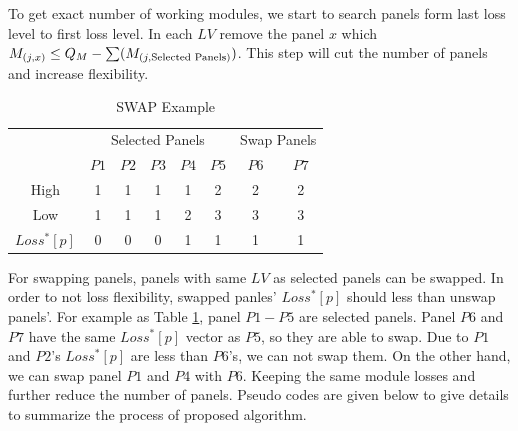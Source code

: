 \documentclass[conference]{IEEEtran}
\begin{document}
To get exact number of working modules, we start to search panels form last loss level to first loss level. In each $LV$ remove the panel $x$ which $M_{(j,x)} \leq Q_M - \sum (M_{(j,\textup{Selected Panels})})$. This step will cut the number of panels and increase flexibility.

\begin{table}[htbp]
\caption{SWAP Example}
\begin{center}
\begin{tabular}{c|ccccc|cc}\hline \hline
                               & \multicolumn{5}{c|}{Selected Panels} & \multicolumn{2}{c}{Swap Panels} \\
                               & $P1$    & $P2$   & $P3$    & $P4$    & $P5$   & $P6$            & $P7$             \\ \hline
High                           & 1     & 1     & 1     & 1     & 2    & 2              & 2              \\ \hline
Low                            & 1     & 1     & 1     & 2     & 3    & 3              & 3              \\ \hline
$Loss^*[p]$ & 0     & 0     & 0     & 1     & 1    & 1              & 1             
\end{tabular}
\end{center}
\label{table_swap}
\end{table}

For swapping panels, panels with same $LV$ as selected panels can be swapped. In order to not loss flexibility, swapped panles' $Loss^*[p]$ should less than unswap panels'. For example as Table \ref{table_swap}, panel $P1-P5$ are selected panels. Panel $P6$ and $P7$ have the same $Loss^*[p]$ vector as $P5$, so they are able to swap. Due to $P1$ and $P2$'s $Loss^*[p]$ are less than $P6$'s, we can not swap them. On the other hand, we can swap panel $P1$ and $P4$ with $P6$. Keeping the same module losses and further reduce the number of panels.  Pseudo codes are given below to give details to summarize the process of proposed algorithm.
\end{document}
